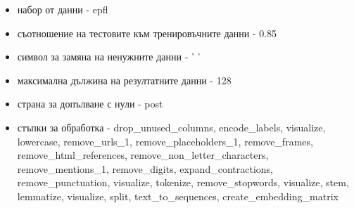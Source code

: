 \documentclass{article}
\begin{document}
\begin{itemize}
  \begin{itemize}
    \item набор от данни - epfl
    \item съотношение на тестовите към тренировъчните данни - 0.85
    \item символ за замяна на ненужните данни - ' '
    \item максимална дължина на резултатните данни - 128
    \item страна за допълване с нули - post
    \item стъпки за обработка - drop\_unused\_columns, encode\_labels, visualize, lowercase, remove\_urls\_1,
    remove\_placeholders\_1, remove\_frames, remove\_html\_references, remove\_non\_letter\_characters,
    remove\_mentions\_1, remove\_digits, expand\_contractions, remove\_punctuation, visualize, tokenize,
    remove\_stopwords, visualize, stem, lemmatize, visualize, split, text\_to\_sequences, create\_embedding\_matrix
  \end{itemize}


\end{itemize}
\end{document}
